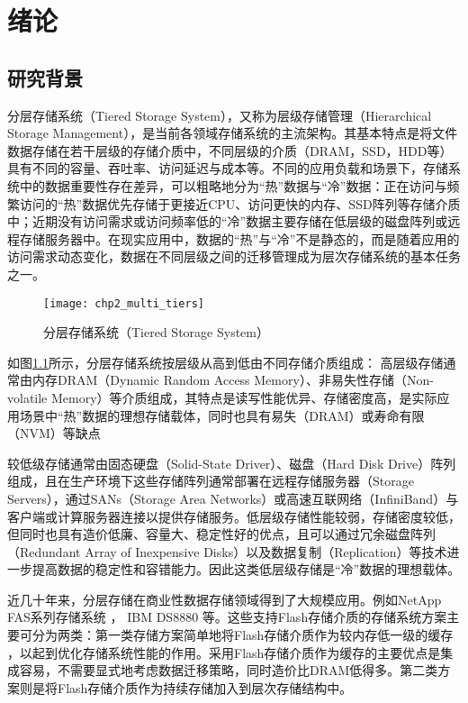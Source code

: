 \chapter{绪论}
\section{研究背景}
分层存储系统（Tiered Storage System），又称为层级存储管理（Hierarchical Storage Management），是当前各领域存储系统的主流架构。其基本特点是将文件数据存储在若干层级的存储介质中，不同层级的介质（DRAM，SSD，HDD等）具有不同的容量、吞吐率、访问延迟与成本等。不同的应用负载和场景下，存储系统中的数据重要性存在差异，可以粗略地分为“热”数据与“冷”数据：正在访问与频繁访问的“热”数据优先存储于更接近CPU、访问更快的内存、SSD阵列等存储介质中；近期没有访问需求或访问频率低的“冷”数据主要存储在低层级的磁盘阵列或远程存储服务器中。在现实应用中，数据的“热”与“冷”不是静态的，而是随着应用的访问需求动态变化，数据在不同层级之间的迁移管理成为层次存储系统的基本任务之一。
\begin{figure}[htp]
    \centering
    \texttt{[image: chp2\_multi\_tiers]}
    \caption{分层存储系统（Tiered Storage System）}
    \label{fig:multi_tiers}
\end{figure}
如图\ref{fig:multi_tiers}所示，分层存储系统按层级从高到低由不同存储介质组成：
高层级存储通常由内存DRAM（Dynamic Random Access Memory）、非易失性存储（Non-volatile Memory）等介质组成，其特点是读写性能优异、存储密度高，是实际应用场景中“热”数据的理想存储载体，同时也具有易失（DRAM）或寿命有限（NVM）等缺点

较低级存储通常由固态硬盘（Solid-State Driver）、磁盘（Hard Disk Drive）阵列组成，且在生产环境下这些存储阵列通常部署在远程存储服务器（Storage Servers），通过SANs（Storage Area Networks）或高速互联网络（InfiniBand）与客户端或计算服务器连接以提供存储服务。低层级存储性能较弱，存储密度较低，但同时也具有造价低廉、容量大、稳定性好的优点，且可以通过冗余磁盘阵列（Redundant Array of Inexpensive Disks）以及数据复制（Replication）等技术进一步提高数据的稳定性和容错能力。因此这类低层级存储是“冷”数据的理想载体。

近几十年来，分层存储在商业性数据存储领域得到了大规模应用。例如NetApp FAS系列存储系统
\cite{NetAppFas}，
IBM DS8880
\cite{IBMDS8880}
等。这些支持Flash存储介质的存储系统方案主要可分为两类：第一类存储方案简单地将Flash存储介质作为较内存低一级的缓存
\cite{NetAppFas}
，以起到优化存储系统性能的作用。采用Flash存储介质作为缓存的主要优点是集成容易，不需要显式地考虑数据迁移策略，同时造价比DRAM低得多。第二类方案则是将Flash存储介质作为持续存储加入到层次存储结构中。

